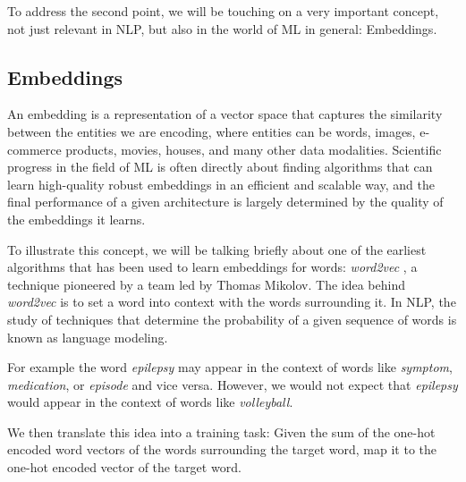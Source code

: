 To address the second point, we will be touching on a very important concept, not just relevant in NLP, but also in the world of ML in general: Embeddings.

\subsection{Embeddings}
An embedding is a representation of a vector space that captures the similarity between the entities we are encoding, where entities can be words, images, e-commerce products, movies, houses, and many other data modalities.
Scientific progress in the field of ML is often directly about finding algorithms that can learn high-quality robust embeddings in an efficient and scalable way, and the final performance of a given architecture is largely determined by the quality of the embeddings it learns.

To illustrate this concept, we will be talking briefly about one of the earliest algorithms that has been used to learn embeddings for words: \textit{word2vec} \cite{mikolov13}, a technique pioneered by a team led by Thomas Mikolov.
The idea behind \textit{word2vec} is to set a word into context with the words surrounding it. In NLP, the study of techniques that determine the probability of a given sequence of words is known as language modeling.

For example the word \textit{epilepsy} may appear in the context of words like \textit{symptom}, \textit{medication}, or \textit{episode} and vice versa.
However, we would not expect that \textit{epilepsy} would appear in the context of words like \textit{volleyball}.

We then translate this idea into a training task:
Given the sum of the one-hot encoded word vectors of the words surrounding the target word, map it to the one-hot encoded vector of the target word.

